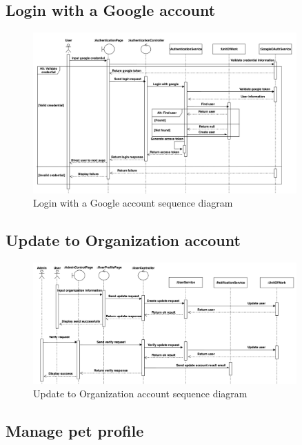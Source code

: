 \subsection{Login with a Google account}

\begin{figure}[H]
    \centering
    \includegraphics[width=0.9\textwidth]{Figures/login_gg_seq.png}
    \caption{Login with a Google account sequence diagram}
    \label{fig:login-google-seq}
\end{figure}

\subsection{Update to Organization account}

\begin{figure}[H]
    \centering
    \includegraphics[width=0.9\textwidth]{Figures/update_org_seq.png}
    \caption{Update to Organization account sequence diagram}
    \label{fig:update-org-seq}
\end{figure}
\clearpage

\subsection{Manage pet profile}

